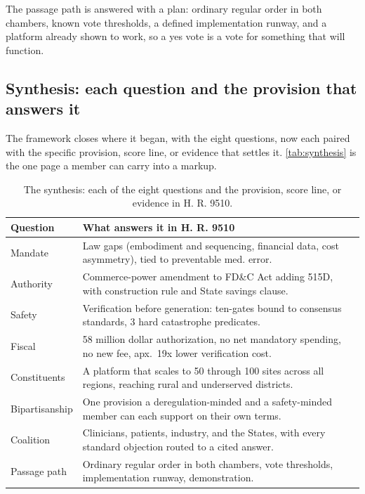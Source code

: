 
The passage path is answered with a plan: ordinary regular order in both chambers,
known vote thresholds, a defined implementation runway, and a platform already shown
to work, so a yes vote is a vote for something that will function.

\subsection*{Synthesis: each question and the provision that answers it}

The framework closes where it began, with the eight questions, now each paired with
the specific provision, score line, or evidence that settles it.
\autoref{tab:synthesis} is the one page a member can carry into a markup.

\begin{table}[H]
\footnotesize
\begin{tabularx}{\textwidth}{@{}L{2.25cm} Y@{}}
\toprule
\textbf{Question} & \textbf{What answers it in H. R. 9510}\\
\midrule
Mandate & Law gaps (embodiment and sequencing, financial data, cost asymmetry), tied to preventable med. error.\\
Authority & Commerce-power amendment to FD\&C Act adding 515D, with construction rule and State savings clause.\\
Safety & Verification before generation: ten-gates bound to consensus standards, 3 hard catastrophe predicates.\\
Fiscal & 58 million dollar authorization, no net mandatory spending, no new fee, apx.\ 19x lower verification cost.\\
Constituents & A platform that scales to 50 through 100 sites across all regions, reaching rural and underserved districts.\\
Bipartisanship & One provision a deregulation-minded and a safety-minded member can each support on their own terms.\\
Coalition & Clinicians, patients, industry, and the States, with every standard objection routed to a cited answer.\\
Passage path & Ordinary regular order in both chambers, vote thresholds, implementation runway, demonstration.\\
\bottomrule
\end{tabularx}
\caption{The synthesis: each of the eight questions and the provision, score
line, or evidence in H. R. 9510.}
\label{tab:synthesis}
\end{table}

\clearpage